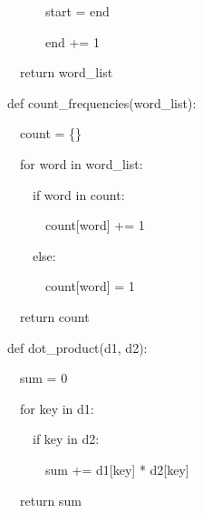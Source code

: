 \documentclass[letterpaper]{article}
\begin{document}
{\ttfamily
\ \ \ \ \ \ start = end}

{\ttfamily
\ \ \ \ \ \ end += 1}

{\ttfamily
\ \ return word\_list}


\bigskip

{\ttfamily
def count\_frequencies(word\_list):}

{\ttfamily
\ \ count = \{\}}


\bigskip

{\ttfamily
\ \ for word in word\_list:}

{\ttfamily
\ \ \ \ if word in count:}

{\ttfamily
\ \ \ \ \ \ count[word] += 1}

{\ttfamily
\ \ \ \ else:}

{\ttfamily
\ \ \ \ \ \ count[word] = 1}


\bigskip

{\ttfamily
\ \ return count}


\bigskip

def dot\_product(d1, d2):

\ \ sum = 0

\ \ for key in d1:

\ \ \ \ if key in d2:

\ \ \ \ \ \ sum += d1[key] * d2[key]


\bigskip

\ \ return sum


\bigskip
\end{document}
